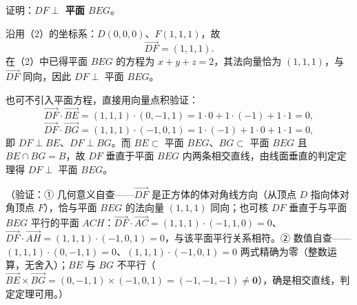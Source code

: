 \begin{answer}

证明：\textbf{\(DF\perp\) 平面 \(BEG\)}。

沿用（2）的坐标系：\(D(0,0,0)\)、\(F(1,1,1)\)，故
\nopagebreak[4]
\[
\overrightarrow{DF}=(1,1,1).
\]
在（2）中已得平面 \(BEG\) 的方程为 \(x+y+z=2\)，其法向量恰为 \((1,1,1)\)，与 \(\overrightarrow{DF}\) 同向，因此 \(DF\perp\) 平面 \(BEG\)。

也可不引入平面方程，直接用向量点积验证：
\nopagebreak[4]
\[
\overrightarrow{DF}\cdot\overrightarrow{BE}=(1,1,1)\cdot(0,-1,1)=1\cdot0+1\cdot(-1)+1\cdot1=0,
\]
\nopagebreak[4]
\[
\overrightarrow{DF}\cdot\overrightarrow{BG}=(1,1,1)\cdot(-1,0,1)=1\cdot(-1)+1\cdot0+1\cdot1=0,
\]
即 \(DF\perp BE\)、\(DF\perp BG\)。而 \(BE\subset\) 平面 \(BEG\)、\(BG\subset\) 平面 \(BEG\) 且 \(BE\cap BG=B\)，故 \(DF\) 垂直于平面 \(BEG\) 内两条相交直线，由线面垂直的判定定理得 \(DF\perp\) 平面 \(BEG\)。

（验证：① 几何意义自查——\(\overrightarrow{DF}\) 是正方体的体对角线方向（从顶点 \(D\) 指向体对角顶点 \(F\)），恰与平面 \(BEG\) 的法向量 \((1,1,1)\) 同向；也可核 \(DF\) 垂直于与平面 \(BEG\) 平行的平面 \(ACH\)：\(\overrightarrow{DF}\cdot\overrightarrow{AC}=(1,1,1)\cdot(-1,1,0)=0\)、\(\overrightarrow{DF}\cdot\overrightarrow{AH}=(1,1,1)\cdot(-1,0,1)=0\)，与该平面平行关系相符。② 数值自查——\((1,1,1)\cdot(0,-1,1)=0\)、\((1,1,1)\cdot(-1,0,1)=0\) 两式精确为零（整数运算，无舍入）；\(BE\) 与 \(BG\) 不平行（\(\overrightarrow{BE}\times\overrightarrow{BG}=(0,-1,1)\times(-1,0,1)=(-1,-1,-1)\neq\mathbf{0}\)），确是相交直线，判定定理可用。）




\end{answer}
